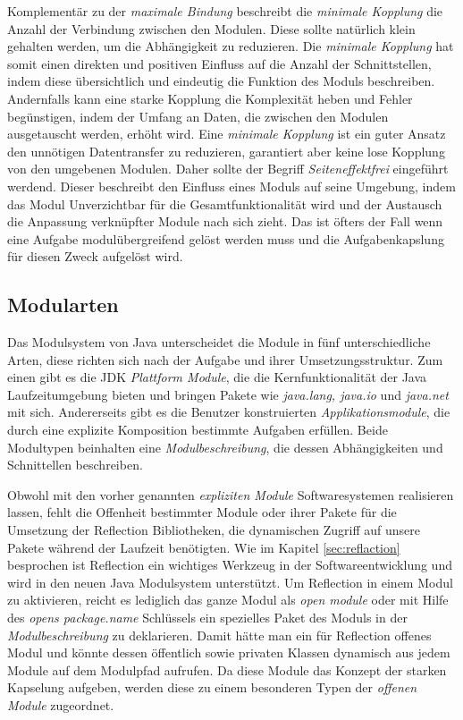     Komplementär zu der \textit{maximale Bindung} beschreibt die \textit{minimale Kopplung} die Anzahl der Verbindung zwischen den Modulen. Diese sollte natürlich klein gehalten werden, um die Abhängigkeit zu reduzieren. Die \textit{minimale Kopplung} hat somit einen direkten und positiven Einfluss auf die Anzahl der Schnittstellen, indem diese übersichtlich und eindeutig die Funktion des Moduls beschreiben. Andernfalls kann eine starke Kopplung die Komplexität heben und Fehler begünstigen, indem der Umfang an Daten, die zwischen den Modulen ausgetauscht werden, erhöht wird. Eine \textit{minimale Kopplung} ist ein guter Ansatz den unnötigen Datentransfer zu reduzieren, garantiert aber keine lose Kopplung von den umgebenen Modulen. Daher sollte der Begriff \textit{Seiteneffektfrei} eingeführt werdend. Dieser beschreibt den Einfluss eines Moduls auf seine Umgebung, indem das Modul Unverzichtbar für die Gesamtfunktionalität wird und der Austausch die Anpassung verknüpfter Module nach sich zieht. Das ist öfters der Fall wenn eine Aufgabe modulübergreifend gelöst werden muss und die Aufgabenkapslung für diesen Zweck aufgelöst wird.

  \subsection{Modularten}
    Das Modulsystem von Java unterscheidet die Module in fünf unterschiedliche Arten, diese richten sich nach der Aufgabe und ihrer Umsetzungsstruktur. Zum einen gibt es die JDK \textit{Plattform Module}, die die Kernfunktionalität der Java Laufzeitumgebung bieten und bringen Pakete wie \textit{java.lang, java.io} und \textit{java.net} mit sich. 
    Andererseits gibt es die Benutzer konstruierten \textit{Applikationsmodule}, die durch eine explizite Komposition bestimmte Aufgaben erfüllen. Beide Modultypen beinhalten eine \textit{Modulbeschreibung}, die dessen Abhängigkeiten und Schnittellen beschreiben. 
    
    Obwohl mit den vorher genannten \textit{expliziten Module} Softwaresystemen realisieren lassen, fehlt die Offenheit bestimmter Module oder ihrer Pakete für die Umsetzung der Reflection Bibliotheken, die dynamischen Zugriff auf unsere Pakete während der Laufzeit benötigten. Wie im Kapitel \ref{sec:reflaction} besprochen ist Reflection ein wichtiges Werkzeug in der Softwareentwicklung und wird in den neuen Java Modulsystem unterstützt. Um Reflection in einem Modul zu aktivieren, reicht es lediglich das ganze Modul als \textit{open module} oder mit Hilfe des \textit{opens package.name} Schlüssels ein spezielles Paket des Moduls in der \textit{Modulbeschreibung} zu deklarieren. Damit hätte man ein für Reflection offenes Modul und könnte dessen öffentlich sowie privaten Klassen dynamisch aus jedem Module auf dem Modulpfad aufrufen. Da diese Module das Konzept der starken Kapselung aufgeben, werden diese zu einem besonderen Typen der \textit{offenen Module} zugeordnet.

